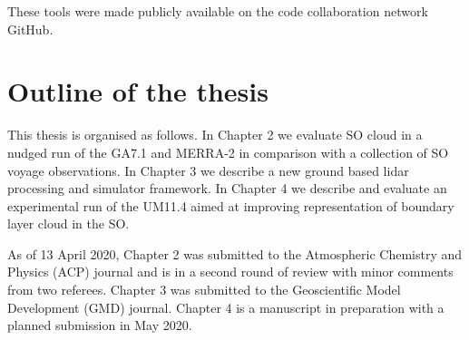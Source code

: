 \noindent
These tools were made publicly available on the code collaboration network
GitHub.

\section{Outline of the thesis}

This thesis is organised as follows. In Chapter 2 we evaluate
SO cloud in a nudged run of the GA7.1 and MERRA-2 in comparison
with a collection of SO voyage observations. In Chapter 3 we
describe a new ground based lidar processing and simulator framework.
In Chapter 4 we describe and evaluate an experimental run of the UM11.4 aimed at
improving representation of boundary layer cloud in the SO.

As of 13 April 2020, Chapter 2 was submitted to the Atmospheric
Chemistry and Physics (ACP) journal and is in a second round of review
with minor comments from two referees. Chapter 3 was submitted to the
Geoscientific Model Development (GMD) journal. Chapter 4 is a manuscript
in preparation with a planned submission in May 2020.
